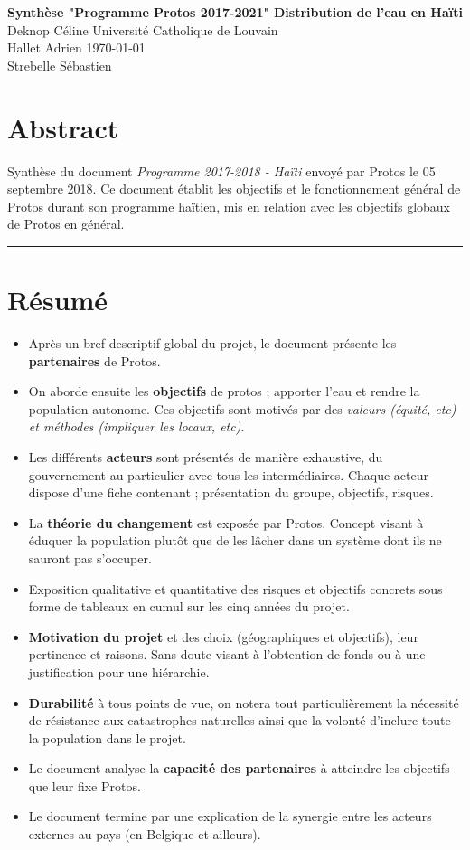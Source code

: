 \documentclass[a4paper, 11pt]{article}
\begin{document}
\noindent
\large\textbf{Synthèse "Programme Protos 2017-2021"} \hfill \textbf{Distribution de l'eau en Haïti} \\
\normalsize Deknop Céline \hfill Université Catholique de Louvain \\
Hallet Adrien \hfill \today \\
Strebelle Sébastien

\section*{Abstract}
Synthèse du document \textit{Programme 2017-2018 - Haïti} envoyé par Protos le 05 septembre 2018. Ce document établit les objectifs et le fonctionnement général de Protos durant son programme haïtien, mis en relation avec les objectifs globaux de Protos en général.
\hrule

\section*{Résumé}
\begin{itemize}
  \item Après un bref descriptif global du projet, le document présente les \textbf{partenaires} de Protos.
  \item On aborde ensuite les \textbf{objectifs} de protos ; apporter l'eau et rendre la population autonome. Ces objectifs sont motivés par des \textit{valeurs (équité, etc) et méthodes (impliquer les locaux, etc)}.
  \item Les différents \textbf{acteurs} sont présentés de manière exhaustive, du gouvernement au particulier avec tous les intermédiaires. Chaque acteur dispose d'une fiche contenant ; présentation du groupe, objectifs, risques.
  \item La \textbf{théorie du changement} est exposée par Protos. Concept visant à éduquer la population plutôt que de les lâcher dans un système dont ils ne sauront pas s'occuper.
  \item Exposition qualitative et quantitative des risques et objectifs concrets sous forme de tableaux en cumul sur les cinq années du projet.
  \item \textbf{Motivation du projet} et des choix (géographiques et objectifs), leur pertinence et raisons. Sans doute visant à l'obtention de fonds ou à une justification pour une hiérarchie.
  \item \textbf{Durabilité} à tous points de vue, on notera tout particulièrement la nécessité de résistance aux catastrophes naturelles ainsi que la volonté d'inclure toute la population dans le projet.
  \item Le document analyse la \textbf{capacité des partenaires} à atteindre les objectifs que leur fixe Protos.
  \item Le document termine par une explication de la synergie entre les acteurs externes au pays (en Belgique et ailleurs).
\end{itemize}
\end{document}
